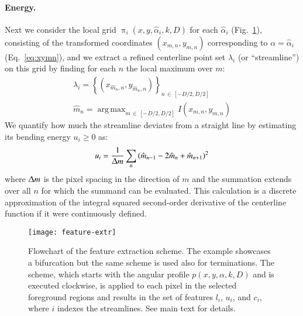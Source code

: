 \documentclass[twocolumn,natbib]{svjour3}
\DeclareMathOperator*{\argmax}{arg\,max}
\begin{document}
\paragraph{Energy.} Next we consider the local grid $\uppi_{i}(x,y,\hat{\alpha}_{i},k,D)$ for each $\hat{\alpha}_{i}$ (Fig.~\ref{fig:feature-extraction}), consisting of the transformed coordinates $(x_{m,n},y_{m,n})$ corresponding to $\alpha=\hat{\alpha}_{i}$ (Eq.~\ref{eq:xymn}), and we extract a refined centerline point set $\lambda_{i}$ (or ``streamline'') on this grid by finding for each $n$ the local maximum over $m$:
\begin{gather}
\label{eq:refine-centerline} 
\lambda_{i} = \left\{(x_{\hat{m}_{n},n},y_{\hat{m}_{n},n})\right\}_{n\,\in\,\left[-D/2,D/2\right]}\\[0.5ex]
\hat{m}_{n} = \argmax_{m\,\in\,\left[-D/2,D/2\right]} I(x_{m,n},y_{m,n})
\label{eq:hatm}
\end{gather}
We quantify how much the streamline deviates from a straight line by estimating its bending energy $u_{i}\geq0$ as:
\begin{equation}
u_{i} = \frac{1}{\Updelta m}\sum_{n} \left( \hat{m}_{n-1} - 2\hat{m}_{n} + \hat{m}_{n+1} \right)^2
\end{equation}
where $\Updelta m$ is the pixel spacing in the direction of $m$ and the summation extends over all $n$ for which the summand can be evaluated. This calculation is a discrete approximation of the integral squared second-order derivative of the centerline function if it were continuously defined.

\begin{figure}[!t]
\centering
\texttt{[image: feature-extr]}
\caption{Flowchart of the feature extraction scheme. The example showcases a bifurcation but the same scheme is used also for terminations. The scheme, which starts with the angular profile $p(x,y,\alpha,k,D)$ and is executed clockwise, is applied to each pixel in the selected foreground regions and results in the set of features $l_i$, $u_i$, and $c_i$, where $i$ indexes the streamlines. See main text for details.}
\label{fig:feature-extraction}
\end{figure}
\end{document}
